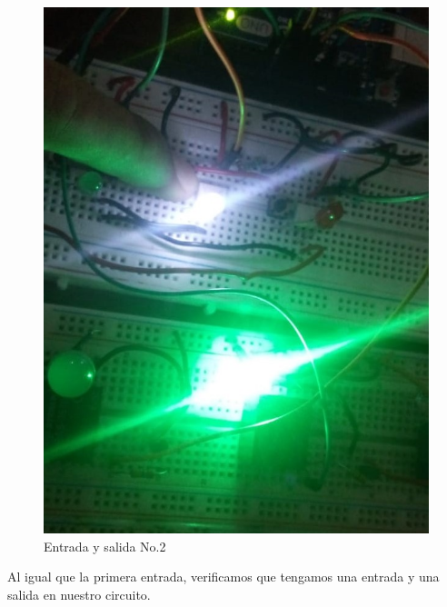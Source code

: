 \documentclass[12pt,a4paper]{article}
\begin{document}
\begin{figure}[hbtp]
\centering
\includegraphics[scale=0.3]{Circuito/2.jpeg}
\caption{Entrada y salida No.2}
\end{figure}
\newpage
Al igual que la primera entrada, verificamos que tengamos una entrada y una salida en nuestro circuito.\\
\end{document}
